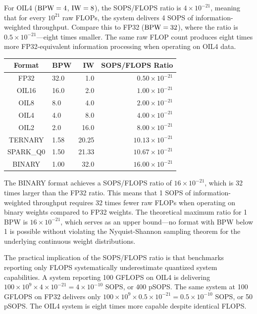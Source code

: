 For OIL4 ($\textnormal{BPW} = 4$, $\mathrm{IW} = 8$), the SOPS/FLOPS ratio is $4 \times 10^{-21}$, meaning that for every $10^{21}$ raw FLOPs, the system delivers 4 SOPS of information-weighted throughput. Compare this to FP32 ($\textnormal{BPW} = 32$), where the ratio is $0.5 \times 10^{-21}$---eight times smaller. The same raw FLOP count produces eight times more FP32-equivalent information processing when operating on OIL4 data.

\begin{center}
\tablestyle
\begin{tabular}{clrr}
\toprule
\textbf{Format} & \textbf{BPW} & \textbf{IW} & \textbf{SOPS/FLOPS Ratio} \\
\midrule
FP32 & 32.0 & 1.0 & $0.50 \times 10^{-21}$ \\
OIL16 & 16.0 & 2.0 & $1.00 \times 10^{-21}$ \\
OIL8 & 8.0 & 4.0 & $2.00 \times 10^{-21}$ \\
OIL4 & 4.0 & 8.0 & $4.00 \times 10^{-21}$ \\
OIL2 & 2.0 & 16.0 & $8.00 \times 10^{-21}$ \\
TERNARY & 1.58 & 20.25 & $10.13 \times 10^{-21}$ \\
SPARK\_Q0 & 1.50 & 21.33 & $10.67 \times 10^{-21}$ \\
BINARY & 1.00 & 32.0 & $16.00 \times 10^{-21}$ \\
\bottomrule
\end{tabular}
\end{center}

The BINARY format achieves a SOPS/FLOPS ratio of $16 \times 10^{-21}$, which is 32 times larger than the FP32 ratio. This means that 1 SOPS of information-weighted throughput requires 32 times fewer raw FLOPs when operating on binary weights compared to FP32 weights. The theoretical maximum ratio for 1 BPW is $16 \times 10^{-21}$, which serves as an upper bound---no format with BPW below 1 is possible without violating the Nyquist-Shannon sampling theorem for the underlying continuous weight distributions.

The practical implication of the SOPS/FLOPS ratio is that benchmarks reporting only FLOPS systematically underestimate quantized system capabilities. A system reporting 100 GFLOPS on OIL4 is delivering $100 \times 10^9 \times 4 \times 10^{-21} = 4 \times 10^{-10}$ SOPS, or 400 pSOPS. The same system at 100 GFLOPS on FP32 delivers only $100 \times 10^9 \times 0.5 \times 10^{-21} = 0.5 \times 10^{-10}$ SOPS, or 50 pSOPS. The OIL4 system is eight times more capable despite identical FLOPS.

